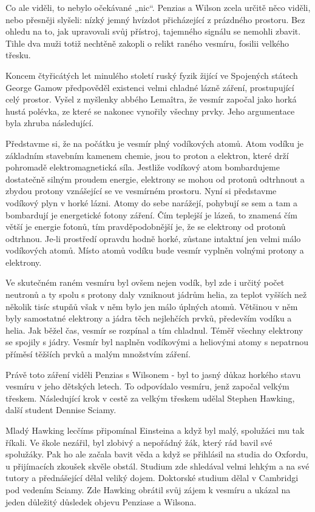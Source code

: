   Co ale viděli, to nebylo očekávané „nic“. Penzias a Wilson zcela určitě něco viděli, nebo přesněji
  slyšeli: nízký jemný hvízdot přicházející z prázdného prostoru. Bez ohledu na to, jak upravovali
  svůj přístroj, tajemného signálu se nemohli zbavit. Tihle dva muži totiž nechtěně zakopli o relikt
  raného vesmíru, fosilii velkého třesku. 

  Koncem čtyřicátých let minulého století ruský fyzik žijící ve Spojených státech George Gamow
  předpověděl existenci velmi chladné lázně záření, prostupující celý prostor. Vyšel z myšlenky
  abbého Lemaîtra, že vesmír započal jako horká hustá polévka, ze které se nakonec vynořily všechny
  prvky. Jeho argumentace byla zhruba následující. 

  Představme si, že na počátku je vesmír plný vodíkových atomů. Atom vodíku je základním stavebním
  kamenem chemie, jsou to proton a elektron, které drží pohromadě elektromagnetická síla. Jestliže
  vodíkový atom bombardujeme dostatečně silným proudem energie, elektrony se mohou od protonů
  odtrhnout a zbydou protony vznášející se ve vesmírném prostoru. Nyní si představme vodíkový plyn v
  horké lázni. Atomy do sebe narážejí, pohybují se sem a tam a bombardují je energetické fotony
  záření. Čím teplejší je lázeň, to znamená čím větší je energie fotonů, tím pravděpodobnější je, že
  se elektrony od protonů odtrhnou. Je-li prostředí opravdu hodně horké, zůstane intaktní jen velmi
  málo vodíkových atomů. Místo atomů vodíku bude vesmír vyplněn volnými protony a elektrony.

  Ve skutečném raném vesmíru byl ovšem nejen vodík, byl zde i určitý počet neutronů a ty spolu s
  protony daly vzniknout jádrům helia, za teplot vyšších než několik tisíc stupňů však v něm bylo
  jen málo úplných atomů. Většinou v něm byly samostatné elektrony a jádra těch nejlehčích prvků,
  především vodíku a helia. Jak běžel čas, vesmír se rozpínal a tím chladnul. Téměř všechny
  elektrony se spojily s jádry. Vesmír byl naplněn vodíkovými a heliovými atomy s nepatrnou příměsí
  těžších prvků a malým množstvím záření. 

  Právě toto záření viděli Penzias s Wilsonem - byl to jasný důkaz horkého stavu vesmíru v jeho
  dětských letech. To odpovídalo vesmíru, jenž započal velkým třeskem. Následující krok v cestě za
  velkým třeskem udělal Stephen Hawking, další student Dennise Sciamy. 

  Mladý Hawking lecčíms připomínal Einsteina a když byl malý, spolužáci mu tak říkali. Ve škole
  nezářil, byl zlobivý a nepořádný žák, který rád bavil své spolužáky. Pak ho ale začala bavit věda
  a když se přihlásil na studia do Oxfordu, u přijímacích zkoušek skvěle obstál. Studium zde
  shledával velmi lehkým a na své tutory a přednášející dělal veliký dojem. Doktorské studium dělal
  v Cambridgi pod vedením Sciamy. Zde Hawking obrátil svůj zájem k vesmíru a ukázal na jeden
  důležitý důsledek objevu Penziase a Wilsona. 

